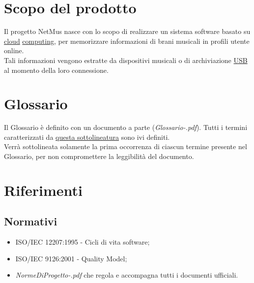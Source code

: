 
\section{Scopo del prodotto}
Il progetto NetMus nasce con lo scopo di realizzare un sistema
software basato su \underline{cloud} \underline{computing}, per memorizzare
informazioni di brani musicali in profili utente online.\\ Tali informazioni vengono estratte da
dispositivi musicali o di archiviazione \underline{USB} al momento della loro connessione.

\section{Glossario}
Il Glossario \`e definito con un documento a parte
(\emph{Glossario-\versioneglossario.pdf}). Tutti i termini caratterizzati da
\underline{questa sottolineatura} sono ivi definiti.\\
Verr\`a sottolineata solamente la prima occorrenza di ciascun
termine presente nel Glossario, per non compromettere la leggibilit\`a del documento.

\newpage
\section{Riferimenti}

\subsection{Normativi} %
\begin{itemize}
  \item ISO/IEC 12207:1995 - Cicli di vita software;
  \item ISO/IEC 9126:2001 - Quality Model;
  \item \emph{NormeDiProgetto-\versionenormeprogetto.pdf} che regola e
  accompagna tutti i documenti ufficiali.
\end{itemize}

